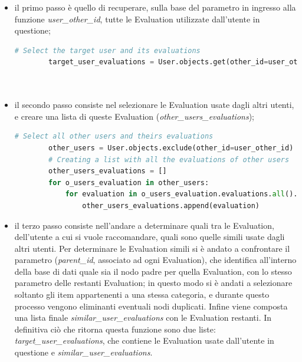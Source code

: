 \begin{itemize}
    \item il primo passo è quello di recuperare, sulla base del parametro in ingresso alla funzione \textit{user\_other\_id}, 
    tutte le Evaluation utilizzate dall'utente in questione;
    \begin{lstlisting}[language=Python, label=lst:UB_CF_2]
        # Select the target user and its evaluations
        target_user_evaluations = User.objects.get(other_id=user_other_id).evaluations.all()\
                                                                          .values('other_id', 'parent_id')\
                                                                          .order_by('other_id')
    \end{lstlisting}
    \item il secondo passo consiste nel selezionare le Evaluation usate dagli altri utenti, e creare una lista di queste Evaluation 
    (\textit{other\_users\_evaluations});
    \begin{lstlisting}[language=Python, label=lst:UB_CF_3]
        # Select all other users and theirs evaluations
        other_users = User.objects.exclude(other_id=user_other_id)
        # Creating a list with all the evaluations of other users
        other_users_evaluations = []
        for o_users_evaluation in other_users:
            for evaluation in o_users_evaluation.evaluations.all().values('other_id', 'parent_id').order_by('other_id'):
                other_users_evaluations.append(evaluation)
    \end{lstlisting}
    \item il terzo passo consiste nell'andare a determinare quali tra le Evaluation, dell'utente a cui si vuole raccomandare, quali sono quelle 
    simili usate dagli altri utenti. Per determinare le Evaluation simili si è andato a confrontare il parametro (\textit{parent\_id}, 
    associato ad ogni Evaluation), che identifica all'interno della base di dati quale sia il nodo padre per quella Evaluation, con lo stesso 
    parametro delle restanti Evaluation; in questo modo si è andati a selezionare soltanto gli item appartenenti a una stessa categoria, e 
    durante questo processo vengono eliminanti eventuali nodi duplicati. Infine viene composta una lista finale \textit{similar\_user\_evaluations} 
    con le Evaluation restanti.
    In definitiva ciò che ritorna questa funzione sono due liste: \textit{target\_user\_evaluations}, che contiene le Evaluation usate dall'utente 
    in questione e \textit{similar\_user\_evaluations}.

\end{itemize}
